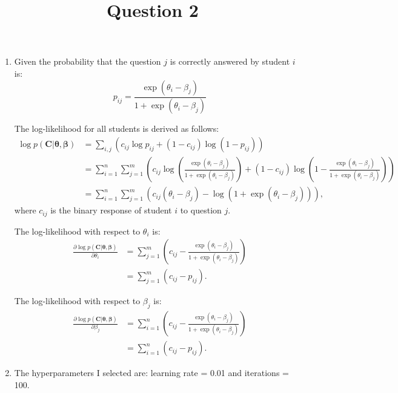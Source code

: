 \documentclass{article}
\title{Question 2}
\date{\vspace{-7.5ex}}
\begin{document}
\maketitle
\thispagestyle{fancy}

\begin{enumerate}[label=(\alph*)]
    \item Given the probability that the question $j$ is correctly answered by student $i$ is:
    \begin{equation*}
        p_{ij} =  \frac{\exp(\theta_i - \beta_j)}{1 + \exp(\theta_i - \beta_j)}
    \end{equation*}
    
    The log-likelihood for all students is derived as follows:
    \begin{align*}
        \log p(\mathbf{C}|\boldsymbol{\theta}, \boldsymbol{\beta}) &= \sum_{i, j} (c_{ij} \log p_{ij} + (1 - c_{ij}) \log (1 - p_{ij})) \\
        &= \sum_{i=1}^{n} \sum_{j=1}^{m} \left( c_{ij} \log \left( \frac{\exp(\theta_i - \beta_j)}{1 + \exp(\theta_i - \beta_j)} \right) + (1 - c_{ij}) \log \left( 1 - \frac{\exp(\theta_i - \beta_j)}{1 + \exp(\theta_i - \beta_j)} \right) \right) \\
        &= \sum_{i=1}^{n} \sum_{j=1}^{m} (c_{ij} (\theta_i - \beta_j) - \log(1 + \exp(\theta_i - \beta_j))),
    \end{align*}
    where $c_{ij}$ is the binary response of student $i$ to question $j$.

    The log-likelihood with respect to $\theta_i$ is:
    \begin{align*}
        \frac{\partial \log p(\mathbf{C}|\boldsymbol{\theta}, \boldsymbol{\beta})}{\partial \theta_i} &= \sum_{j=1}^{m} \left( c_{ij} - \frac{\exp(\theta_i - \beta_j)}{1 + \exp(\theta_i - \beta_j)} \right) \\
        &= \sum_{j=1}^{m} (c_{ij} - p_{ij}).
    \end{align*}

    The log-likelihood with respect to $\beta_j$ is:
    \begin{align*}
        \frac{\partial \log p(\mathbf{C}|\boldsymbol{\theta}, \boldsymbol{\beta})}{\partial \beta_j} &= \sum_{i=1}^{n} \left( c_{ij} - \frac{\exp(\theta_i - \beta_j)}{1 + \exp(\theta_i - \beta_j)} \right) \\
        &= \sum_{i=1}^{n} (c_{ij} - p_{ij}).
    \end{align*}

    \item The hyperparameters I selected are: learning rate = 0.01 and iterations = 100.
    

\end{enumerate}
\end{document}
